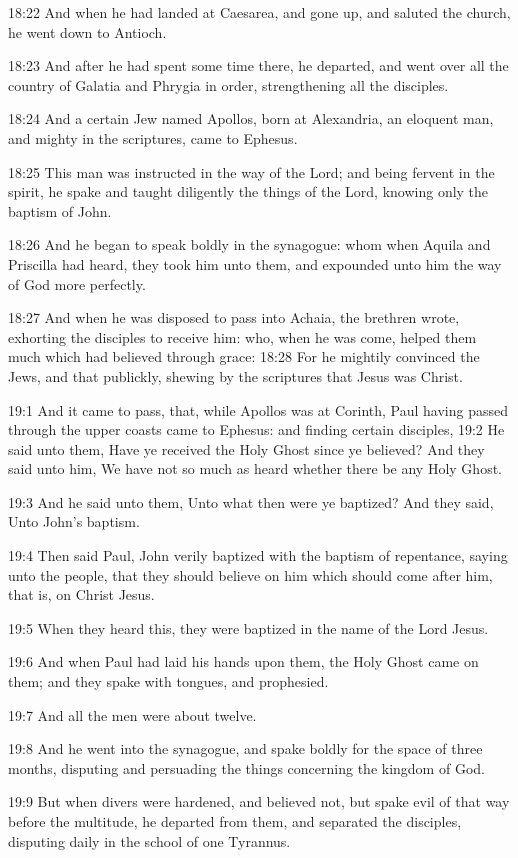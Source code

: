 18:22 And when he had landed at Caesarea, and gone up, and saluted the church, he went down to Antioch.

18:23 And after he had spent some time there, he departed, and went over all the country of Galatia and Phrygia in order, strengthening all the disciples.

18:24 And a certain Jew named Apollos, born at Alexandria, an eloquent man, and mighty in the scriptures, came to Ephesus.

18:25 This man was instructed in the way of the Lord; and being fervent in the spirit, he spake and taught diligently the things of the Lord, knowing only the baptism of John.

18:26 And he began to speak boldly in the synagogue: whom when Aquila and Priscilla had heard, they took him unto them, and expounded unto him the way of God more perfectly.

18:27 And when he was disposed to pass into Achaia, the brethren wrote, exhorting the disciples to receive him: who, when he was come, helped them much which had believed through grace: 18:28 For he mightily convinced the Jews, and that publickly, shewing by the scriptures that Jesus was Christ.

19:1 And it came to pass, that, while Apollos was at Corinth, Paul having passed through the upper coasts came to Ephesus: and finding certain disciples, 19:2 He said unto them, Have ye received the Holy Ghost since ye believed?  And they said unto him, We have not so much as heard whether there be any Holy Ghost.

19:3 And he said unto them, Unto what then were ye baptized? And they said, Unto John's baptism.

19:4 Then said Paul, John verily baptized with the baptism of repentance, saying unto the people, that they should believe on him which should come after him, that is, on Christ Jesus.

19:5 When they heard this, they were baptized in the name of the Lord Jesus.

19:6 And when Paul had laid his hands upon them, the Holy Ghost came on them; and they spake with tongues, and prophesied.

19:7 And all the men were about twelve.

19:8 And he went into the synagogue, and spake boldly for the space of three months, disputing and persuading the things concerning the kingdom of God.

19:9 But when divers were hardened, and believed not, but spake evil of that way before the multitude, he departed from them, and separated the disciples, disputing daily in the school of one Tyrannus.

